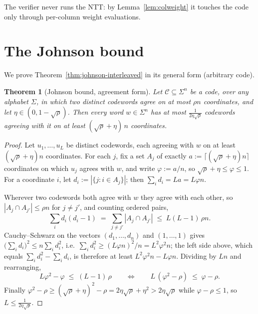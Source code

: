 \documentclass[11pt]{article}
\theoremstyle{plain}
\newtheorem{theorem}{Theorem}[section]
\theoremstyle{definition}
\theoremstyle{remark}
\begin{document}
The verifier never runs the NTT: by Lemma~\ref{lem:colweight} it touches the code only through per-column weight evaluations.

\section{The Johnson bound}\label{app:johnson}

We prove Theorem~\ref{thm:johnson-interleaved} in its general form (arbitrary code).

\begin{theorem}[Johnson bound, agreement form]\label{thm:johnson-general}
Let $\mathcal{C} \subseteq \Sigma^n$ be a code, over any alphabet $\Sigma$, in which two distinct codewords agree on at most $\rho n$ coordinates, and let $\eta \in (0, 1 - \sqrt{\rho})$. Then every word $w \in \Sigma^n$ has at most $\tfrac{1}{2\eta\sqrt{\rho}}$ codewords agreeing with it on at least $(\sqrt{\rho} + \eta)\, n$ coordinates.
\end{theorem}

\begin{proof}
Let $u_1, \dots, u_L$ be distinct codewords, each agreeing with $w$ on at least $(\sqrt{\rho}+\eta) n$ coordinates. For each $j$, fix a set $A_j$ of exactly $a := \lceil (\sqrt{\rho}+\eta) n \rceil$ coordinates on which $u_j$ agrees with $w$, and write $\varphi := a/n$, so $\sqrt{\rho} + \eta \le \varphi \le 1$. For a coordinate $i$, let $d_i := |\{ j : i \in A_j \}|$; then $\sum_i d_i = L a = L \varphi n$.

Wherever two codewords both agree with $w$ they agree with each other, so $|A_j \cap A_{j'}| \le \rho n$ for $j \neq j'$, and counting ordered pairs,
\[
\sum_i d_i (d_i - 1) \;=\; \sum_{j \neq j'} |A_j \cap A_{j'}| \;\le\; L(L-1)\, \rho n .
\]
Cauchy--Schwarz on the vectors $(d_1, \dots, d_n)$ and $(1, \dots, 1)$ gives $\bigl(\sum_i d_i\bigr)^2 \le n \sum_i d_i^2$, i.e.\ $\sum_i d_i^2 \ge (L \varphi n)^2 / n = L^2 \varphi^2 n$; the left side above, which equals $\sum_i d_i^2 - \sum_i d_i$, is therefore at least $L^2 \varphi^2 n - L \varphi n$. Dividing by $Ln$ and rearranging,
\[
L \varphi^2 - \varphi \;\le\; (L-1)\, \rho
\qquad\Longleftrightarrow\qquad
L\, (\varphi^2 - \rho) \;\le\; \varphi - \rho .
\]
Finally $\varphi^2 - \rho \ge (\sqrt{\rho}+\eta)^2 - \rho = 2\eta\sqrt{\rho} + \eta^2 > 2\eta\sqrt{\rho}$ while $\varphi - \rho \le 1$, so $L \le \tfrac{1}{2\eta\sqrt{\rho}}$.
\end{proof}
\end{document}

